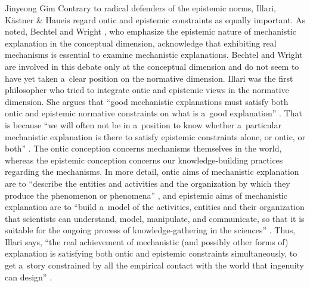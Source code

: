 \begin{artengenv}{Jinyeong Gim}
Contrary to radical defenders of the epistemic norms, Illari, Kästner \& Haueis regard ontic and epistemic constraints as equally important. As noted, Bechtel and Wright
\parencite*[][]{wright_mechanisms_2007}, %
 who emphasize the epistemic nature of mechanistic explanation in the conceptual dimension, acknowledge that exhibiting real mechanisms is essential to examine mechanistic explanations. Bechtel and Wright are involved in this debate only at the conceptual dimension and do not seem to have yet taken a~clear position on the normative dimension. Illari 
\parencite*[][]{illari_mechanistic_2013} %
 was the first philosopher who tried to integrate ontic and epistemic views in the normative dimension. She argues that ``good mechanistic explanations must satisfy both ontic and epistemic normative constraints on what is a~good explanation'' 
\parencite[][p.237]{illari_mechanistic_2013}. %
 That is because ``we will often not be in a~position to know whether a~particular mechanistic explanation is there to satisfy epistemic constraints alone, or ontic, or both'' 
\parencite[][p.254]{illari_mechanistic_2013}. %
 The ontic conception concerns mechanisms themselves in the world, whereas the epistemic conception concerns our knowledge-building practices regarding the mechanisms. In more detail, ontic aims of mechanistic explanation are to ``describe the entities and activities and the organization by which they produce the phenomenon or phenomena'' 
\parencite[][p.250]{illari_mechanistic_2013}, %
 and epistemic aims of mechanistic explanation are to ``build a~model of the activities, entities and their organization that scientists can understand, model, manipulate, and communicate, so that it is suitable for the ongoing process of knowledge-gathering in the sciences'' 
\parencite[][p.250]{illari_mechanistic_2013}. %
 Thus, Illari says, ``the real achievement of mechanistic (and possibly other forms of) explanation is satisfying both ontic and epistemic constraints simultaneously, to get a~story constrained by all the empirical contact with the world that ingenuity can design'' 
\parencite[][p.253]{illari_mechanistic_2013}.%



\end{artengenv}
